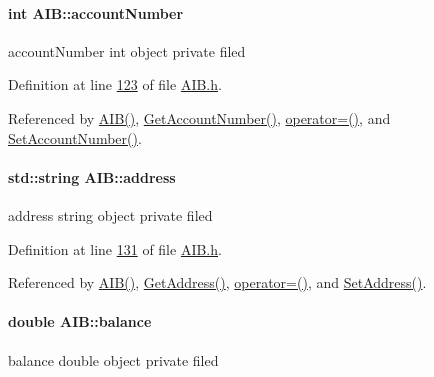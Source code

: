 \paragraph[{\texorpdfstring{account\+Number}{accountNumber}}]{\setlength{\rightskip}{0pt plus 5cm}int A\+I\+B\+::account\+Number\hspace{0.3cm}{\ttfamily [private]}}\hypertarget{class_a_i_b_aafc08efeec5b8c800c32ee32f20603a7_aafc08efeec5b8c800c32ee32f20603a7}{}\label{class_a_i_b_aafc08efeec5b8c800c32ee32f20603a7_aafc08efeec5b8c800c32ee32f20603a7}
account\+Number int object private filed 

Definition at line \hyperlink{_a_i_b_8h_source_l00123}{123} of file \hyperlink{_a_i_b_8h_source}{A\+I\+B.\+h}.



Referenced by \hyperlink{_a_i_b_8h_source_l00028}{A\+I\+B()}, \hyperlink{_a_i_b_8cpp_source_l00096}{Get\+Account\+Number()}, \hyperlink{_a_i_b_8h_source_l00078}{operator=()}, and \hyperlink{_a_i_b_8cpp_source_l00090}{Set\+Account\+Number()}.

\paragraph[{\texorpdfstring{address}{address}}]{\setlength{\rightskip}{0pt plus 5cm}std\+::string A\+I\+B\+::address\hspace{0.3cm}{\ttfamily [private]}}\hypertarget{class_a_i_b_ae6a67cc33d1e5fa83a52a238e45ca3dc_ae6a67cc33d1e5fa83a52a238e45ca3dc}{}\label{class_a_i_b_ae6a67cc33d1e5fa83a52a238e45ca3dc_ae6a67cc33d1e5fa83a52a238e45ca3dc}
address string object private filed 

Definition at line \hyperlink{_a_i_b_8h_source_l00131}{131} of file \hyperlink{_a_i_b_8h_source}{A\+I\+B.\+h}.



Referenced by \hyperlink{_a_i_b_8h_source_l00028}{A\+I\+B()}, \hyperlink{_a_i_b_8cpp_source_l00072}{Get\+Address()}, \hyperlink{_a_i_b_8h_source_l00078}{operator=()}, and \hyperlink{_a_i_b_8cpp_source_l00066}{Set\+Address()}.

\paragraph[{\texorpdfstring{balance}{balance}}]{\setlength{\rightskip}{0pt plus 5cm}double A\+I\+B\+::balance\hspace{0.3cm}{\ttfamily [private]}}\hypertarget{class_a_i_b_a3c8d637bd997c1f062d844a88e2559ba_a3c8d637bd997c1f062d844a88e2559ba}{}\label{class_a_i_b_a3c8d637bd997c1f062d844a88e2559ba_a3c8d637bd997c1f062d844a88e2559ba}
balance double object private filed 

